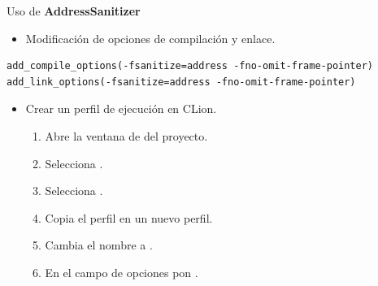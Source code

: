 \begin{frame}[t,fragile]{Uso de \textbf{AddressSanitizer}}
\begin{itemize}
  \item Modificación de opciones de compilación y enlace.
\end{itemize}
\begin{lstlisting}
add_compile_options(-fsanitize=address -fno-omit-frame-pointer)
add_link_options(-fsanitize=address -fno-omit-frame-pointer)
\end{lstlisting}

\begin{itemize}
  \item Crear un perfil de ejecución en CLion.
    \begin{enumerate}
      \item Abre la ventana de  del proyecto.
      \item Selecciona .
      \item Selecciona .
      \item Copia el perfil  en un nuevo perfil.
      \item Cambia el nombre a .
      \item En el campo de opciones pon 
            .
    \end{enumerate}
\end{itemize}
\end{frame}

